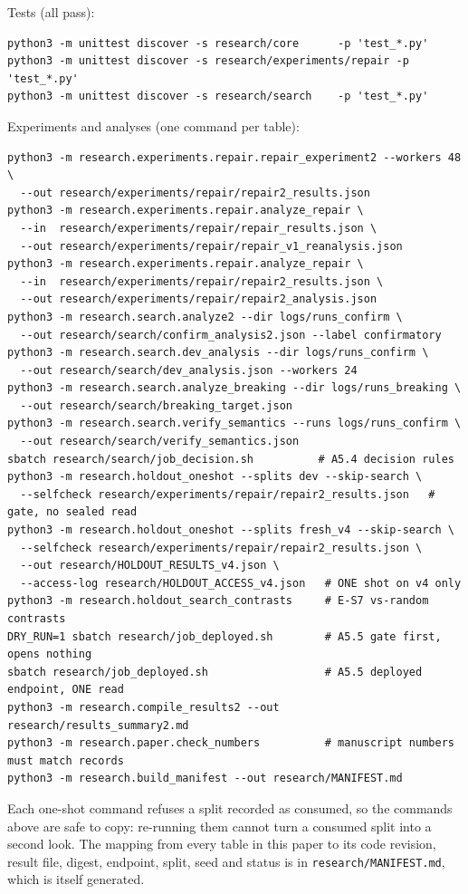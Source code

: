 \documentclass{neurips_2024}
\begin{document}
\noindent
Tests (all pass):
\begin{verbatim}
python3 -m unittest discover -s research/core      -p 'test_*.py'
python3 -m unittest discover -s research/experiments/repair -p 'test_*.py'
python3 -m unittest discover -s research/search    -p 'test_*.py'
\end{verbatim}
Experiments and analyses (one command per table):
\begin{verbatim}
python3 -m research.experiments.repair.repair_experiment2 --workers 48 \
  --out research/experiments/repair/repair2_results.json
python3 -m research.experiments.repair.analyze_repair \
  --in  research/experiments/repair/repair_results.json \
  --out research/experiments/repair/repair_v1_reanalysis.json
python3 -m research.experiments.repair.analyze_repair \
  --in  research/experiments/repair/repair2_results.json \
  --out research/experiments/repair/repair2_analysis.json
python3 -m research.search.analyze2 --dir logs/runs_confirm \
  --out research/search/confirm_analysis2.json --label confirmatory
python3 -m research.search.dev_analysis --dir logs/runs_confirm \
  --out research/search/dev_analysis.json --workers 24
python3 -m research.search.analyze_breaking --dir logs/runs_breaking \
  --out research/search/breaking_target.json
python3 -m research.search.verify_semantics --runs logs/runs_confirm \
  --out research/search/verify_semantics.json
sbatch research/search/job_decision.sh          # A5.4 decision rules
python3 -m research.holdout_oneshot --splits dev --skip-search \
  --selfcheck research/experiments/repair/repair2_results.json   # gate, no sealed read
python3 -m research.holdout_oneshot --splits fresh_v4 --skip-search \
  --selfcheck research/experiments/repair/repair2_results.json \
  --out research/HOLDOUT_RESULTS_v4.json \
  --access-log research/HOLDOUT_ACCESS_v4.json   # ONE shot on v4 only
python3 -m research.holdout_search_contrasts     # E-S7 vs-random contrasts
DRY_RUN=1 sbatch research/job_deployed.sh        # A5.5 gate first, opens nothing
sbatch research/job_deployed.sh                  # A5.5 deployed endpoint, ONE read
python3 -m research.compile_results2 --out research/results_summary2.md
python3 -m research.paper.check_numbers          # manuscript numbers must match records
python3 -m research.build_manifest --out research/MANIFEST.md
\end{verbatim}
Each one-shot command refuses a split recorded as consumed, so the commands above are safe
to copy: re-running them cannot turn a consumed split into a second look. The mapping from
every table in this paper to its code revision, result file, digest, endpoint, split, seed
and status is in \texttt{research/MANIFEST.md}, which is itself generated.
\end{document}
